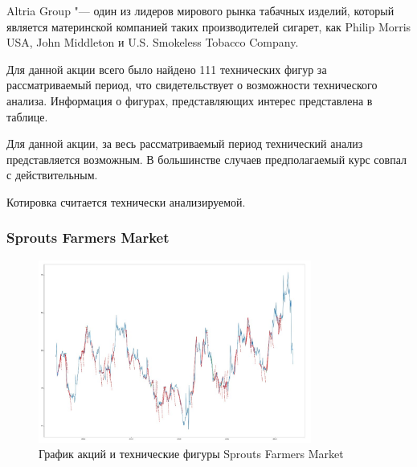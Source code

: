 \documentclass[bachelor, och, coursework]{SCWorks}
\begin{document}
        
            Altria Group "--- один из лидеров мирового рынка табачных изделий, 
            который является материнской компанией таких производителей сигарет, 
            как Philip Morris USA, John Middleton и U.S. Smokeless Tobacco 
            Company.
    
        
        Для данной акции всего было найдено 111 технических фигур за 
        рассматриваемый период, что свидетельствует о возможности технического 
        анализа. Информация о фигурах, представляющих интерес представлена в 
        таблице.
        
        Для данной акции, за весь рассматриваемый период технический анализ 
        представляется возможным. В большинстве случаев предполагаемый курс 
        совпал с действительным.
        
        Котировка считается технически анализируемой.

        \subsubsection{Sprouts Farmers Market}
    
        \begin{figure}[H]
            \centering
            \includegraphics[width=0.8\textwidth]{pic/SFM.jpg}
            \caption{График акций и технические фигуры Sprouts Farmers Market}
        \end{figure}
       
        \pagebreak
\end{document}
